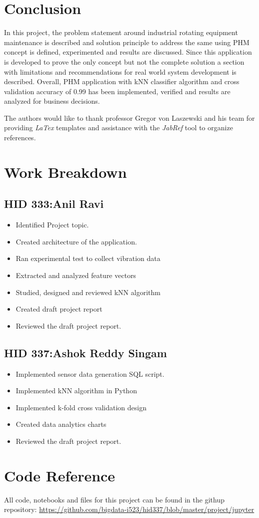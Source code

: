 \documentclass[sigconf]{acmart}
\begin{document}
\section{Conclusion}
In this project, the problem statement around industrial rotating equipment maintenance is described and solution principle to address the same using PHM concept is defined, experimented and results are discussed. Since this application is developed to prove the only concept but not the complete solution a section with limitations and recommendations for real world system development is described. Overall, PHM application with kNN classifier algorithm and cross validation accuracy of 0.99 has been implemented, verified and results are analyzed for business decisions.
\begin{acks}

  The authors would like to thank professor Gregor von Laszewski and his team for providing \textit{LaTex} templates and assistance with the \textit{JabRef} tool to organize references.

\end{acks}


 
\newpage
\appendix
\section{Work Breakdown}
\subsection{HID 333:Anil Ravi}
\begin{itemize}
  \item Identified Project topic.
  \item Created architecture of the application.
  \item Ran experimental test to collect vibration data
  \item Extracted and analyzed feature vectors
  \item Studied, designed and reviewed kNN algorithm
  \item Created draft project report
  \item Reviewed the draft project report.
  
\end{itemize}
\subsection{HID 337:Ashok Reddy Singam}
\begin{itemize}
  \item Implemented sensor data generation SQL script.
  \item Implemented kNN algorithm in Python
  \item Implemented k-fold cross validation design
  \item Created data analytics charts
  \item Reviewed the draft project report.
\end{itemize}

\section{Code Reference}
All code, notebooks and files for this project can be found in the githup repository:
\url{https://github.com/bigdata-i523/hid337/blob/master/project/jupyter}
\end{document}
